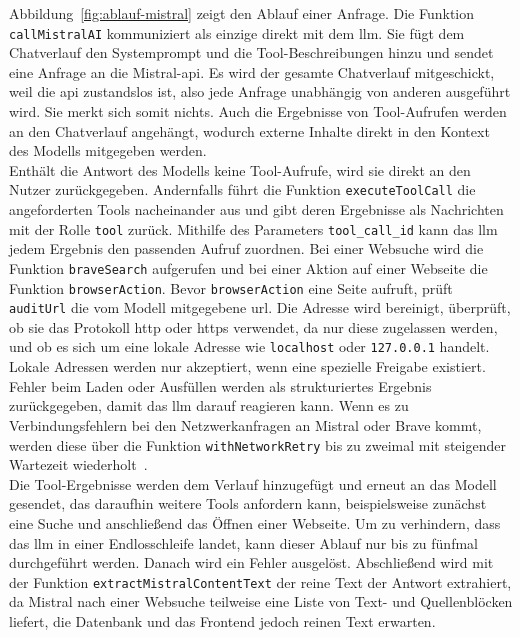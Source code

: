 Abbildung~\ref{fig:ablauf-mistral} zeigt den Ablauf einer Anfrage. Die Funktion \texttt{callMistralAI} kommuniziert als einzige direkt mit dem \ac{llm}. 
Sie fügt dem Chatverlauf den Systemprompt und die Tool-Beschreibungen hinzu und sendet eine Anfrage an die Mistral-\ac{api}. Es wird der gesamte Chatverlauf
mitgeschickt, weil die \ac{api} zustandslos ist, also jede Anfrage unabhängig von anderen ausgeführt wird. Sie merkt sich somit nichts. Auch die Ergebnisse
von Tool-Aufrufen werden an den Chatverlauf angehängt, wodurch externe Inhalte direkt in den Kontext des Modells mitgegeben werden.  \\
Enthält die Antwort des Modells keine Tool-Aufrufe, wird sie direkt an den Nutzer zurückgegeben. Andernfalls führt die Funktion \texttt{executeToolCall} die 
angeforderten Tools nacheinander aus und gibt deren Ergebnisse als Nachrichten mit der Rolle \texttt{tool} zurück. Mithilfe des Parameters \texttt{tool\_call\_id}
kann das \ac{llm} jedem Ergebnis den passenden Aufruf zuordnen. Bei einer Websuche wird die Funktion \texttt{braveSearch} aufgerufen und bei einer Aktion auf 
einer Webseite die Funktion \texttt{browserAction}. Bevor \texttt{browserAction} eine Seite aufruft, prüft \texttt{auditUrl} die vom Modell mitgegebene \ac{url}. 
Die Adresse wird bereinigt, überprüft, ob sie das Protokoll \ac{http} oder \ac{https} verwendet, da nur diese zugelassen werden, und ob es sich um eine lokale Adresse wie 
\texttt{localhost} oder \texttt{127.0.0.1} handelt. Lokale Adressen werden nur akzeptiert, wenn eine spezielle Freigabe existiert. Fehler beim Laden oder Ausfüllen
werden als strukturiertes Ergebnis zurückgegeben, damit das \ac{llm} darauf reagieren kann. Wenn es zu Verbindungsfehlern bei den Netzwerkanfragen an Mistral oder
Brave kommt, werden diese über die Funktion \texttt{withNetworkRetry} bis zu zweimal mit steigender Wartezeit wiederholt~\cite{an16}. \\
Die Tool-Ergebnisse werden dem Verlauf hinzugefügt und erneut an das Modell gesendet, das daraufhin weitere Tools anfordern kann, beispielsweise zunächst eine Suche und
anschließend das Öffnen einer Webseite. Um zu verhindern, dass das \ac{llm} in einer Endlosschleife landet, kann dieser Ablauf nur bis zu fünfmal durchgeführt
werden. Danach wird ein Fehler ausgelöst. Abschließend wird mit der Funktion \texttt{extractMistralContentText} der reine Text der Antwort extrahiert, da Mistral
nach einer Websuche teilweise eine Liste von Text- und Quellenblöcken liefert, die Datenbank und das Frontend jedoch reinen Text erwarten.

